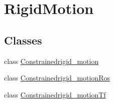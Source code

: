 \hypertarget{group__RigidMotion}{}\section{Rigid\+Motion}
\label{group__RigidMotion}
\subsection*{Classes}
\begin{DoxyCompactItemize}
\item 
class \hyperlink{classConstrainedrigid__motion}{Constrainedrigid\+\_\+motion}
\item 
class \hyperlink{classConstrainedrigid__motionRos}{Constrainedrigid\+\_\+motion\+Ros}
\item 
class \hyperlink{classConstrainedrigid__motionTf}{Constrainedrigid\+\_\+motion\+Tf}
\end{DoxyCompactItemize}
